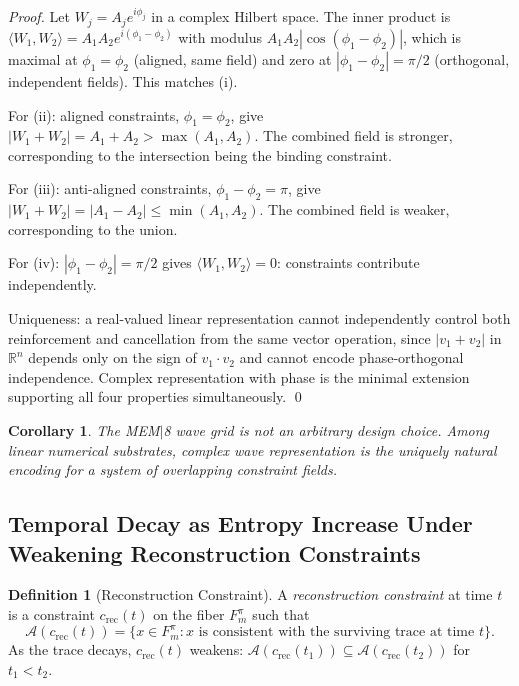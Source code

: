 \documentclass[12pt, a4paper, twoside]{article}
\theoremstyle{plain}
\newtheorem{corollary}[theorem]{Corollary}
\theoremstyle{definition}
\newtheorem{definition}[theorem]{Definition}
\theoremstyle{remark}
\newcommand{\Acc}{\mathcal{A}}
\newcommand{\Proj}{\pi}
\newcommand{\Fibover}[2]{F^{#1}_{#2}}
\begin{document}
\begin{proof}
Let $W_j = A_j e^{i\phi_j}$ in a complex Hilbert space.
The inner product is $\langle W_1, W_2 \rangle = A_1 A_2 e^{i(\phi_1-\phi_2)}$
with modulus $A_1 A_2|\cos(\phi_1-\phi_2)|$, which is maximal at $\phi_1=\phi_2$
(aligned, same field) and zero at $|\phi_1-\phi_2|=\pi/2$ (orthogonal,
independent fields). This matches (i).

For (ii): aligned constraints, $\phi_1=\phi_2$, give
$|W_1+W_2| = A_1+A_2 > \max(A_1,A_2)$.
The combined field is stronger, corresponding to the intersection being the
binding constraint.

For (iii): anti-aligned constraints, $\phi_1-\phi_2=\pi$, give
$|W_1+W_2| = |A_1-A_2| \leq \min(A_1,A_2)$.
The combined field is weaker, corresponding to the union.

For (iv): $|\phi_1-\phi_2|=\pi/2$ gives $\langle W_1,W_2\rangle = 0$:
constraints contribute independently.

Uniqueness: a real-valued linear representation cannot independently control
both reinforcement and cancellation from the same vector operation, since
$|v_1+v_2|$ in $\mathbb{R}^n$ depends only on the sign of $v_1 \cdot v_2$
and cannot encode phase-orthogonal independence. Complex representation with
phase is the minimal extension supporting all four properties simultaneously.
\qed
\end{proof}

\begin{corollary}
The MEM$|$8 wave grid is not an arbitrary design choice. Among linear numerical
substrates, complex wave representation is the \emph{uniquely natural} encoding
for a system of overlapping constraint fields.
\end{corollary}

\subsection{Temporal Decay as Entropy Increase Under Weakening Reconstruction Constraints}

\begin{definition}[Reconstruction Constraint]
\label{def:reconstruction_constraint}
A \emph{reconstruction constraint} at time $t$ is a constraint
$c_{\mathrm{rec}}(t)$ on the fiber $\Fibover{\Proj}{m}$ such that
\[
  \Acc(c_{\mathrm{rec}}(t)) = \bigl\{x \in \Fibover{\Proj}{m} :
  x \text{ is consistent with the surviving trace at time } t\bigr\}.
\]
As the trace decays, $c_{\mathrm{rec}}(t)$ weakens:
$\Acc(c_{\mathrm{rec}}(t_1)) \subseteq \Acc(c_{\mathrm{rec}}(t_2))$ for
$t_1 < t_2$.
\end{definition}
\end{document}
